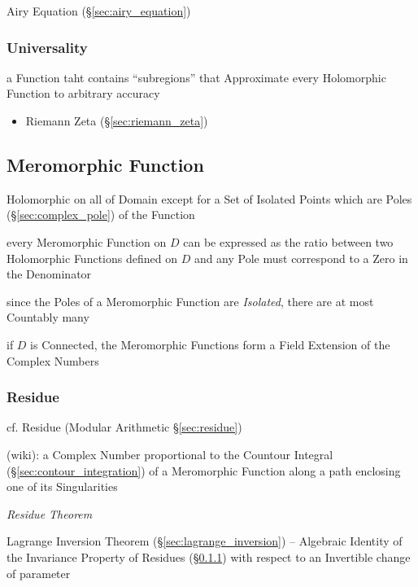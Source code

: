Airy Equation (\S\ref{sec:airy_equation})



\subsubsection{Universality}\label{sec:universality}

a Function taht contains ``subregions'' that Approximate every Holomorphic
Function to arbitrary accuracy

\begin{itemize}
  \item Riemann Zeta (\S\ref{sec:riemann_zeta})
\end{itemize}



\subsection{Meromorphic Function}\label{sec:meromorphic_function}

Holomorphic on all of Domain except for a Set of Isolated Points which are
Poles (\S\ref{sec:complex_pole}) of the Function

every Meromorphic Function on $D$ can be expressed as the ratio between two
Holomorphic Functions defined on $D$ and any Pole must correspond to a Zero in
the Denominator

since the Poles of a Meromorphic Function are \emph{Isolated}, there are at
most Countably many

if $D$ is Connected, the Meromorphic Functions form a Field Extension of the
Complex Numbers



\subsubsection{Residue}\label{sec:meromorphic_residue}

\fist cf. Residue (Modular Arithmetic \S\ref{sec:residue})

(wiki): a Complex Number proportional to the Countour Integral
(\S\ref{sec:contour_integration}) of a Meromorphic Function along a path
enclosing one of its Singularities

\emph{Residue Theorem}

Lagrange Inversion Theorem (\S\ref{sec:lagrange_inversion}) -- Algebraic
Identity of the Invariance Property of Residues
(\S\ref{sec:meromorphic_residue}) with respect to an Invertible change of
parameter



